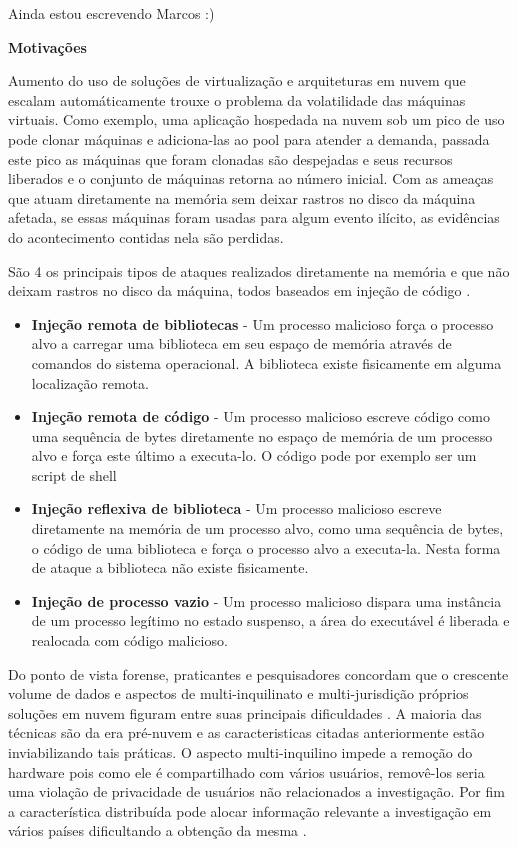 \documentclass[
	12pt,				%
	openright,			%
	oneside,			%
	a4paper,			%
	english,			%
	french,				%
	spanish,			%
	brazil,				%
	]{abntex2}
\begin{document}
Ainda estou escrevendo Marcos :)

\textbf{Motivações}

Aumento do uso de soluções de virtualização e arquiteturas em nuvem que escalam automáticamente \cite{Amazon2016} trouxe o problema da volatilidade das máquinas virtuais. 
Como exemplo, uma aplicação hospedada na nuvem sob um pico de uso pode clonar máquinas e adiciona-las ao pool para atender a demanda, passada este pico as máquinas que foram
clonadas são despejadas e seus recursos liberados e o conjunto de máquinas retorna ao número inicial. Com as ameaças que atuam diretamente na memória sem deixar rastros 
no disco da máquina afetada, se essas máquinas foram usadas para algum evento ilícito, as evidências do acontecimento contidas nela são perdidas.

São 4 os principais tipos de ataques realizados diretamente na memória e que não deixam rastros no disco da máquina, todos baseados em injeção de código \cite{Case2014}.

\begin{itemize}
 \item \textbf{Injeção remota de bibliotecas} - Um processo malicioso força o processo alvo a carregar uma biblioteca em seu espaço de memória através de comandos do sistema operacional.
 A biblioteca existe fisicamente em alguma localização remota.
 \item \textbf{Injeção remota de código} - Um processo malicioso escreve código como uma sequência de bytes diretamente no espaço de memória de um processo alvo e força este 
 último a executa-lo. O código pode por exemplo ser um script de shell
 \item \textbf{Injeção reflexiva de biblioteca} - Um processo malicioso escreve diretamente na memória de um processo alvo, como uma sequência de bytes, o código de uma biblioteca
 e força o processo alvo a executa-la. Nesta forma de ataque a biblioteca não existe fisicamente.
 \item \textbf{Injeção de processo vazio} - Um processo malicioso dispara uma instância de um processo legítimo no estado suspenso, a área do executável é liberada e realocada com 
 código malicioso.
\end{itemize}

Do ponto de vista forense, praticantes e pesquisadores concordam que o crescente volume de dados e aspectos de multi-inquilinato e multi-jurisdição próprios soluções em
nuvem figuram entre suas principais dificuldades \cite{Bash2015a}. A maioria das técnicas são da era pré-nuvem e as caracteristicas citadas anteriormente estão inviabilizando
tais práticas. O aspecto multi-inquilino impede a remoção do hardware pois como ele é compartilhado com vários usuários, removê-los seria uma violação de privacidade de usuários não relacionados
a investigação. Por fim a característica distribuída pode alocar informação relevante a investigação em vários países dificultando a obtenção da mesma \cite{Dykstra2012a}.
\end{document}
